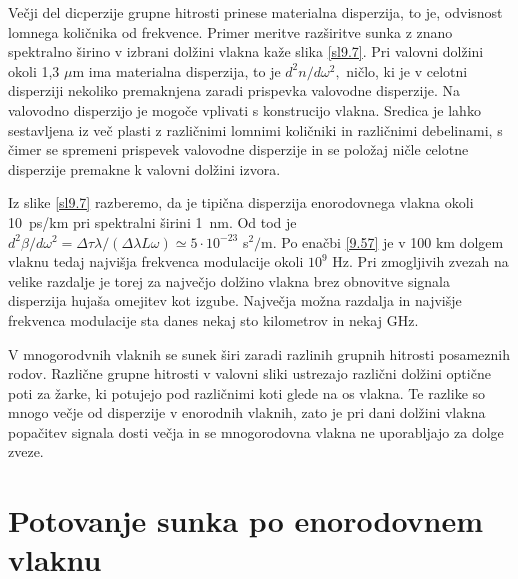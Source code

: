 Večji del dicperzije grupne hitrosti prinese materialna disperzija,
to je, odvisnost lomnega količnika od frekvence. Primer meritve razširitve
sunka z znano spektralno širino v izbrani dolžini vlakna kaže slika
\ref{sl9.7}. Pri valovni dolžini okoli 1,3 $\mu$m ima materialna
disperzija, to je $d^{2}n/d\omega^{2},$ ničlo, ki je v celotni disperziji
nekoliko premaknjena zaradi prispevka valovodne disperzije. Na valovodno
disperzijo je mogoče vplivati s konstrucijo vlakna. Sredica je lahko
sestavljena iz več plasti z različnimi lomnimi količniki in različnimi
debelinami, s čimer se spremeni prispevek valovodne disperzije in
se položaj ničle celotne disperzije premakne k valovni dolžini izvora.

Iz slike \ref{sl9.7} razberemo, da je tipična disperzija enorodovnega
vlakna okoli 10~ps/km pri spektralni širini 1~nm. Od tod je $d^{2}\beta/d\omega^{2}=\Delta\tau\lambda/\left(\Delta\lambda L\omega\right)\simeq5\cdot10^{-23}$
s$^{2}/$m. Po enačbi \ref{9.57} je v 100 km dolgem vlaknu tedaj
najvišja frekvenca modulacije okoli $10^{9}$ Hz. Pri zmogljivih zvezah
na velike razdalje je torej za največjo dolžino vlakna brez obnovitve
signala disperzija hujaša omejitev kot izgube. Največja možna razdalja
in najvišje frekvenca modulacije sta danes nekaj sto kilometrov in
nekaj GHz.

V mnogorodvnih vlaknih se sunek širi zaradi razli\textquotedbl{}nih
grupnih hitrosti posameznih rodov. Različne grupne hitrosti v valovni
sliki ustrezajo različni dolžini optične poti za žarke, ki potujejo
pod različnimi koti glede na os vlakna. Te razlike so mnogo večje
od disperzije v enorodnih vlaknih, zato je pri dani dolžini vlakna
popačitev signala dosti večja in se mnogorodovna vlakna ne uporabljajo
za dolge zveze.


\section{ Potovanje sunka po enorodovnem vlaknu}

